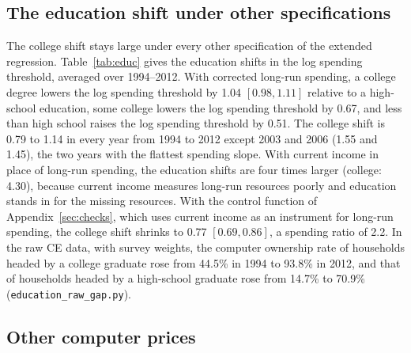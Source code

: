 \documentclass[11pt]{article}
\begin{document}
\FloatBarrier
\subsection{The education shift under other specifications}
\label{app:educrobust}

The college shift stays large under every other specification of the extended regression. Table~\ref{tab:educ} gives the education shifts in the log spending threshold, averaged over 1994--2012. With corrected long-run spending, a college degree lowers the log spending threshold by 1.04 $[0.98, 1.11]$ relative to a high-school education, some college lowers the log spending threshold by 0.67, and less than high school raises the log spending threshold by 0.51. The college shift is 0.79 to 1.14 in every year from 1994 to 2012 except 2003 and 2006 (1.55 and 1.45), the two years with the flattest spending slope. With current income in place of long-run spending, the education shifts are four times larger (college: 4.30), because current income measures long-run resources poorly and education stands in for the missing resources. With the control function of Appendix~\ref{sec:checks}, which uses current income as an instrument for long-run spending, the college shift shrinks to 0.77 $[0.69, 0.86]$, a spending ratio of 2.2. In the raw CE data, with survey weights, the computer ownership rate of households headed by a college graduate rose from 44.5\% in 1994 to 93.8\% in 2012, and that of households headed by a high-school graduate rose from 14.7\% to 70.9\% (\texttt{education\_raw\_gap.py}).

\begin{table}[!htbp]
\centering
\caption{Education shifts in the log spending threshold, $\theta_e$, averaged over 1994--2012, with 90\% intervals from the replicates of the mean. A positive shift means that households with that education own a computer at lower spending than households headed by a high-school graduate. A shift of 1.04 means that a household with that education was as likely to own a computer as a household headed by a high-school graduate that spent 2.8 times as much. The current income, complete income reporters, and control function rows use the 144{,}733 households that report complete, positive income. The logit model's $\hat\beta_t$ is on the logistic scale.}
\label{tab:educ}
\resizebox{\textwidth}{!}{}
\end{table}

\FloatBarrier
\subsection{Other computer prices}
\label{app:prices}
\end{document}
